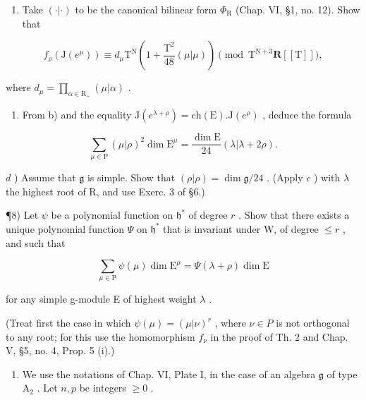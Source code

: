 \begin{enumerate}
\def\labelenumi{\alph{enumi})}
\setcounter{enumi}{1}
\tightlist
\item
  Take \((\cdot |\cdot)\) to be the canonical bilinear form \(\varPhi_{\mathrm{R}}\) (Chap. VI, §1, no. 12). Show that
\end{enumerate}

\[
  f _ {\rho} (\mathrm{J} (e ^ {\mu})) \equiv d _ {\mu} \mathrm{T} ^ {\mathrm{N}} \left(1 + \frac {\mathrm{T} ^ {2}}{48} (\mu | \mu)\right) \pmod {\mathrm{T} ^ {\mathrm{N} + 3} \mathbf {R} [ [ \mathrm{T} ] ]},
\]

where \(d_{\mu} = \prod_{\alpha \in \mathrm{R}_{+}}(\mu |\alpha)\) .

\begin{enumerate}
\def\labelenumi{\alph{enumi})}
\setcounter{enumi}{2}
\tightlist
\item
  From b) and the equality \(\mathrm{J}(e^{\lambda+\rho})=\mathrm{ch}(\mathrm{E}).\mathrm{J}(e^{\rho})\) , deduce the formula
\end{enumerate}

\[
  \sum_ {\mu \in \mathrm{P}} (\mu | \rho) ^ {2} \dim \mathrm{E} ^ {\mu} = \frac {\dim \mathrm{E}}{24} (\lambda | \lambda + 2 \rho).
\]

\(d\) ) Assume that \(\mathfrak{g}\) is simple. Show that \((\rho |\rho) = \dim \mathfrak{g} / 24\) . (Apply \(c\) ) with \(\lambda\) the highest root of R, and use Exerc. 3 of §6.)

¶8) Let \(\psi\) be a polynomial function on \(\mathfrak{h}^*\) of degree \(r\) . Show that there exists a unique polynomial function \(\varPsi\) on \(\mathfrak{h}^*\) that is invariant under W, of degree \(\leq r\) , and such that

\[
\sum_ {\mu \in \mathrm{P}} \psi (\mu) \dim \mathrm{E} ^ {\mu} = \varPsi (\lambda + \rho) \dim \mathrm{E}
\]

for any simple g-module E of highest weight \(\lambda\) .

(Treat first the case in which \(\psi(\mu)=(\mu|\nu)^{r}\) , where \(\nu\in P\) is not orthogonal to any root; for this use the homomorphism \(f_{\nu}\) in the proof of Th. 2 and Chap. V, §5, no. 4, Prop. 5 (i).)

\begin{enumerate}
\def\labelenumi{\arabic{enumi})}
\setcounter{enumi}{8}
\tightlist
\item
  We use the notations of Chap. VI, Plate I, in the case of an algebra \(\mathfrak{g}\) of type \(\mathrm{A}_2\) . Let \(n, p\) be integers \(\geq 0\) .
\end{enumerate}

